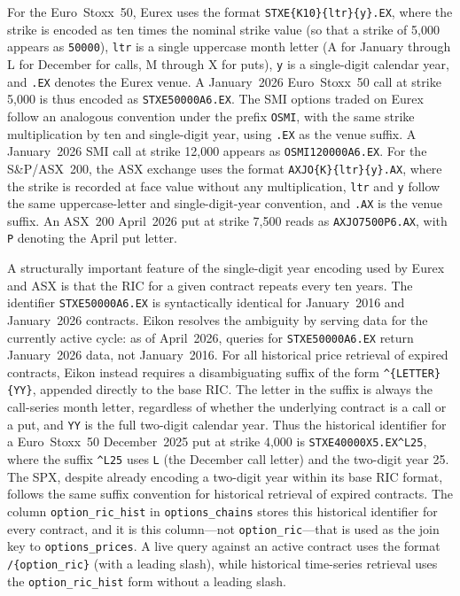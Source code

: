 \documentclass[12pt]{article}
\begin{document}
For the Euro~Stoxx~50, Eurex uses the format
\texttt{STXE\{K{\times}10\}\{ltr\}\{y\}.EX}, where the strike is encoded as ten
times the nominal strike value (so that a strike of 5{,}000 appears as
\texttt{50000}), \texttt{ltr} is a single uppercase month letter (A for January
through L for December for calls, M through X for puts), \texttt{y} is a
single-digit calendar year, and \texttt{.EX} denotes the Eurex venue. A
January~2026 Euro~Stoxx~50 call at strike 5{,}000 is thus encoded as
\texttt{STXE50000A6.EX}. The SMI options traded on Eurex follow an analogous
convention under the prefix \texttt{OSMI}, with the same strike multiplication
by ten and single-digit year, using \texttt{.EX} as the venue suffix. A
January~2026 SMI call at strike 12{,}000 appears as \texttt{OSMI120000A6.EX}.
For the S\&P/ASX~200, the ASX exchange uses the format
\texttt{AXJO\{K\}\{ltr\}\{y\}.AX}, where the strike is recorded at face value
without any multiplication, \texttt{ltr} and \texttt{y} follow the same
uppercase-letter and single-digit-year convention, and \texttt{.AX} is the
venue suffix. An ASX~200 April~2026 put at strike 7{,}500 reads as
\texttt{AXJO7500P6.AX}, with \texttt{P} denoting the April put letter.

A structurally important feature of the single-digit year encoding used by
Eurex and ASX is that the RIC for a given contract repeats every ten years.
The identifier \texttt{STXE50000A6.EX} is syntactically identical for
January~2016 and January~2026 contracts. Eikon resolves the ambiguity by
serving data for the currently active cycle: as of April~2026, queries for
\texttt{STXE50000A6.EX} return January~2026 data, not January~2016. For
all historical price retrieval of expired contracts, Eikon instead requires a
disambiguating suffix of the form \texttt{\^{}\{LETTER\}\{YY\}}, appended
directly to the base RIC. The letter in the suffix is always the call-series
month letter, regardless of whether the underlying contract is a call or a put,
and \texttt{YY} is the full two-digit calendar year. Thus the historical
identifier for a Euro~Stoxx~50 December~2025 put at strike 4{,}000 is
\texttt{STXE40000X5.EX\^{}L25}, where the suffix \texttt{\^{}L25} uses
\texttt{L} (the December call letter) and the two-digit year 25. The SPX,
despite already encoding a two-digit year within its base RIC format, follows
the same suffix convention for historical retrieval of expired contracts.
The column \texttt{option\_ric\_hist} in \texttt{options\_chains} stores this
historical identifier for every contract, and it is this column---not
\texttt{option\_ric}---that is used as the join key to \texttt{options\_prices}.
A live query against an active contract uses the format
\texttt{/\{option\_ric\}} (with a leading slash), while historical time-series
retrieval uses the \texttt{option\_ric\_hist} form without a leading slash.
\end{document}
